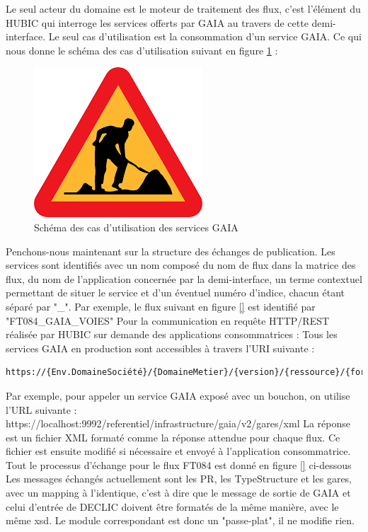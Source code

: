 Le seul acteur du domaine est le moteur de traitement des flux, c'est l'élément du HUBIC qui
interroge les services offerts par GAIA au travers de cette demi-interface.
Le seul cas d'utilisation est la consommation d'un service GAIA. Ce qui nous donne le schéma
des cas d'utilisation suivant en figure \ref{scu} :\begin{figure}[h!]
	\centering
	\includegraphics[width=0.7\linewidth]{img/encours.png}
	\caption{Schéma des cas d'utilisation des services GAIA}
	\label{scu}
\end{figure}

Penchons-nous maintenant sur la structure des échanges de publication.
Les services sont identifiés avec un nom composé du nom de flux dans la matrice des flux, du
nom de l'application concernée par la demi-interface, un terme contextuel permettant de situer
le service et d'un éventuel numéro d'indice, chacun étant séparé par "\_". Par exemple, le flux
suivant en figure \ref{} est identifié par "FT084\_GAIA\_VOIES"
Pour la communication en requête HTTP/REST réalisée par HUBIC sur demande des applications consommatrices :
Tous les services GAIA en production sont accessibles à travers l'URI suivante :\begin{verbatim}
https://{Env.DomaineSociété}/{DomaineMetier}/{version}/{ressource}/{format}
\end{verbatim}

Par exemple, pour appeler un service GAIA exposé avec un bouchon, on utilise l'URL suivante :
https://localhost:9992/referentiel/infrastructure/gaia/v2/gares/xml
La réponse est un fichier XML formaté comme la réponse attendue pour chaque flux. Ce fichier
est ensuite modifié si nécessaire et envoyé à l'application consommatrice. Tout le processus
d'échange pour le flux FT084 est donné en figure \ref{} ci-dessous
Les messages échangés actuellement sont les PR, les TypeStructure et les gares, avec un mapping à l'identique, c'est à dire que le message de sortie de GAIA et celui d'entrée de DECLIC
doivent être formatés de la même manière, avec le même \gls{xsd}. Le module correspondant est
donc un "passe-plat", il ne modifie rien.
